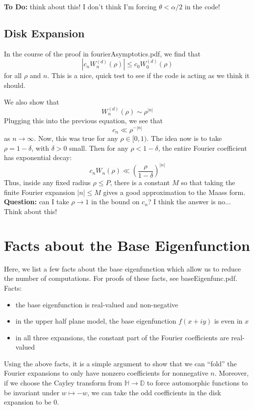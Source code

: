 \documentclass[]{article}
\begin{document}
\textbf{To Do:} think about this! I don't think I'm forcing $\theta < \alpha/2$ in the code!

\subsection*{Disk Expansion}

In the course of the proof in fourierAsymptotics.pdf, we find that
$$
|c_nW_n^{(d)}(\rho)| \leq c_0W_0^{(d)}(\rho)
$$
for all $\rho$ and $n$.
This is a nice, quick test to see if the code is acting as we think it should.

We also show that
$$
W_n^{(d)}(\rho) \sim \rho^{|n|}
$$
Plugging this into the previous equation, we see that
$$
c_n \ll \rho^{-|n|}
$$
as $n \rightarrow \infty$.
Now, this was true for any $\rho \in [0, 1)$.
The idea now is to take $\rho = 1 - \delta$, with $\delta > 0$ small.
Then for any $\rho < 1 - \delta$, the entire Fourier coefficient has exponential decay:
$$
c_nW_n(\rho) \ll \left( \frac{\rho}{1 - \delta} \right)^{|n|}
$$
Thus, inside any fixed radius $\rho \leq P$, there is a constant $M$ so that taking the finite Fourier expansion $|n| \leq M$ gives a good approximation to the Maass form.
\\

\textbf{Question:} can I take $\rho \rightarrow 1$ in the bound on $c_n$? I think the answer is no... Think about this!

\section*{Facts about the Base Eigenfunction}

Here, we list a few facts about the base eigenfunction which allow us to reduce the number of computations.
For proofs of these facts, see baseEigenfunc.pdf.
\\

Facts:
\begin{itemize}
	\item the base eigenfunction is real-valued and non-negative
	\item in the upper half plane model, the base eigenfunction $f(x + iy)$ is even in $x$
	\item in all three expansions, the constant part of the Fourier coefficients are real-valued
\end{itemize}

Using the above facts, it is a simple argument to show that we can ``fold'' the Fourier expansions to only have nonzero coefficients for nonnegative $n$.
Moreover, if we choose the Cayley transform from $\mathbb{H} \rightarrow \mathbb{D}$ to force automorphic functions to be invariant under $w \mapsto -w$, we can take the odd coefficients in the disk expansion to be $0$.
\\
\end{document}
